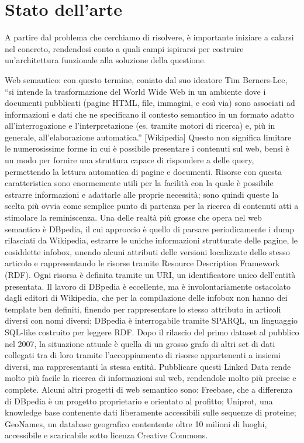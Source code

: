 \documentclass[sigproc-sp.tex]{subfiles}
\begin{document}
\section{Stato dell'arte}
A partire dal problema che cerchiamo di risolvere, è importante iniziare a calarsi nel concreto, rendendosi conto a quali campi ispirarsi per costruire un’architettura funzionale alla soluzione della questione.

Web semantico: con questo termine, coniato dal suo ideatore Tim Berners-Lee, “si intende la trasformazione del World Wide Web in un ambiente dove i documenti pubblicati (pagine HTML, file, immagini, e così via) sono associati ad informazioni e dati che ne specificano il contesto semantico in un formato adatto all'interrogazione e l'interpretazione (es. tramite motori di ricerca) e, più in generale, all'elaborazione automatica.” [Wikipedia]
Questo non significa limitare le numerosissime forme in cui è possibile presentare i contenuti sul web, bensì è un modo per fornire una struttura capace di rispondere a delle query, permettendo la lettura automatica di pagine e documenti. 
Risorse con questa caratteristica sono enormemente utili per la facilità con la quale è possibile estrarre informazioni e adattarle alle proprie necessità; sono quindi queste la scelta più ovvia come semplice punto di partenza per la ricerca di contenuti atti a stimolare la reminiscenza.
Una delle realtà più grosse che opera nel web semantico è DBpedia, il cui approccio è quello di parsare periodicamente i dump rilasciati da Wikipedia, estrarre le uniche informazioni strutturate delle pagine, le cosiddette infobox, unendo alcuni attributi delle versioni localizzate dello stesso articolo e rappresentando le risorse tramite Resource Description Framework (RDF). Ogni risorsa è definita tramite un URI, un identificatore unico dell’entità presentata. Il lavoro di DBpedia è eccellente, ma è involontariamente ostacolato dagli editori di Wikipedia, che per la compilazione delle infobox non hanno dei template ben definiti, finendo per rappresentare lo stesso attributo in articoli diversi con nomi diversi; DBpedia è interrogabile tramite SPARQL, un linguaggio SQL-like costruito per leggere RDF. Dopo il rilascio del primo dataset al pubblico nel 2007, la situazione attuale è quella di un grosso grafo di altri set di dati collegati tra di loro tramite l’accoppiamento di risorse appartenenti a insiemi diversi, ma rappresentanti la stessa entità. Pubblicare questi Linked Data rende molto più facile la ricerca di informazioni sul web, rendendole molto più precise e complete. Alcuni altri progetti di web semantico sono: Freebase, che a differenza di DBpedia è un progetto proprietario e orientato al profitto; Uniprot, una knowledge base contenente dati liberamente accessibili sulle sequenze di proteine; GeoNames, un database geografico contentente oltre 10 milioni di luoghi, accessibile e scaricabile sotto licenza Creative Commons.
\end{document}
